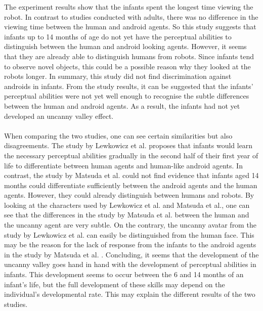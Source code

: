 The experiment results show that the infants spent the longest time viewing the robot. In contrast to studies conducted with adults, there was no difference in the viewing time between the human and android agents. So this study suggests that infants up to 14 months of age do not yet have the perceptual abilities to distinguish between the human and android looking agents. However, it seems that they are already able to distinguish humans from robots. Since infants tend to observe novel objects, this could be a possible reason why they looked at the robots longer. In summary, this study did not find discrimination against androids in infants. From the study results, it can be suggested that the infants' perceptual abilities were not yet well enough to recognise the subtle differences between the human and android agents. As a result, the infants had not yet developed an uncanny valley effect.\\\\
When comparing the two studies, one can see certain similarities but also disagreements. The study by Lewkowicz et al. \cite{uncanny_infants} proposes that infants would learn the necessary perceptual abilities gradually in the second half of their first year of life to differentiate between human agents and human-like android agents. In contrast, the study by Matsuda et al. \cite{uncanny_infant_discrimination} could not find evidence that infants aged 14 months could differentiate sufficiently between the android agents and the human agents. However, they could already distinguish between humans and robots. By looking at the characters used by Lewkowicz et al. and Matsuda et al., one can see that the differences in the study by Matsuda et al. between the human and the uncanny agent are very subtle. On the contrary, the uncanny avatar from the study by Lewkowicz et al. can easily be distinguished from the human face. This may be the reason for the lack of response from the infants to the android agents in the study by Matsuda et al. . Concluding, it seems that the development of the uncanny valley goes hand in hand with the development of perceptual abilities in infants. This development seems to occur between the 6 and 14 months of an infant’s life, but the full development of these skills may depend on the individual’s developmental rate. This may explain the different results of the two studies. 
\newpage

